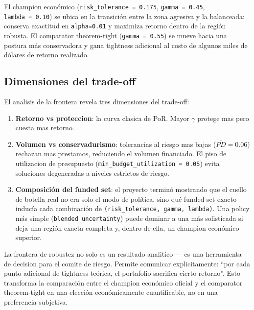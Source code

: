 \documentclass[
  spanish,
  11pt,
  letterpaper,
]{scrbook}
\providecommand{\tightlist}{%
  \setlength{\itemsep}{0pt}\setlength{\parskip}{0pt}}
\theoremstyle{plain}
\theoremstyle{remark}
\begin{document}
El champion económico (\texttt{risk\_tolerance\ =\ 0.175},
\texttt{gamma\ =\ 0.45}, \texttt{lambda\ =\ 0.10}) se ubica en la
transición entre la zona agresiva y la balanceada: conserva exactitud en
\texttt{alpha=0.01} y maximiza retorno dentro de la región robusta. El
comparator theorem-tight (\texttt{gamma\ =\ 0.55}) se mueve hacia una
postura más conservadora y gana tightness adicional al costo de algunos
miles de dólares de retorno realizado.

\subsection{Dimensiones del trade-off}\label{dimensiones-del-trade-off}

El analisis de la frontera revela tres dimensiones del trade-off:

\begin{enumerate}
\def\labelenumi{\arabic{enumi}.}
\tightlist
\item
  \textbf{Retorno vs proteccion}: la curva clasica de PoR. Mayor
  \(\gamma\) protege mas pero cuesta mas retorno.
\item
  \textbf{Volumen vs conservadurismo}: tolerancias al riesgo mas bajas
  (\(\bar{PD} = 0.06\)) rechazan mas prestamos, reduciendo el volumen
  financiado. El piso de utilizacion de presupuesto
  (\texttt{min\_budget\_utilization\ =\ 0.05}) evita soluciones
  degeneradas a niveles estrictos de riesgo.
\item
  \textbf{Composición del funded set}: el proyecto terminó mostrando que
  el cuello de botella real no era solo el modo de política, sino qué
  funded set exacto inducía cada combinación de
  \texttt{(risk\_tolerance,\ gamma,\ lambda)}. Una policy más simple
  (\texttt{blended\_uncertainty}) puede dominar a una más sofisticada si
  deja una región exacta completa y, dentro de ella, un champion
  económico superior.
\end{enumerate}

\begin{tcolorbox}[enhanced jigsaw, arc=.35mm, bottomrule=.15mm, bottomtitle=1mm, breakable, colback=white, colbacktitle=quarto-callout-note-color!10!white, colframe=quarto-callout-note-color-frame, coltitle=black, left=2mm, leftrule=.75mm, opacityback=0, opacitybacktitle=0.6, rightrule=.15mm, title=\textcolor{quarto-callout-note-color}{\faInfo}\hspace{0.5em}{Frontera como herramienta de gobernanza}, titlerule=0mm, toprule=.15mm, toptitle=1mm]

La frontera de robustez no solo es un resultado analitico --- es una
herramienta de decision para el comite de riesgo. Permite comunicar
explicitamente: ``por cada punto adicional de tightness teórica, el
portafolio sacrifica cierto retorno''. Esto transforma la comparación
entre el champion económico oficial y el comparator theorem-tight en una
elección económicamente cuantificable, no en una preferencia subjetiva.

\end{tcolorbox}
\end{document}
